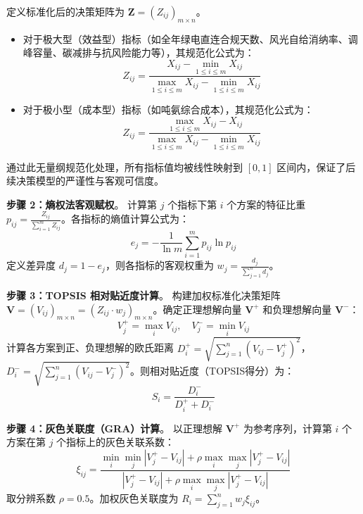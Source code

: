 定义标准化后的决策矩阵为 $\mathbf{Z} = (Z_{ij})_{m \times n}$。
\begin{itemize}
    \item 对于极大型（效益型）指标（如全年绿电直连合规天数、风光自给消纳率、调峰容量、碳减排与抗风险能力等），其规范化公式为：
    \begin{equation}
    Z_{ij} = \frac{X_{ij} - \min_{1 \le i \le m} X_{ij}}{\max_{1 \le i \le m} X_{ij} - \min_{1 \le i \le m} X_{ij}}
    \end{equation}
    \item 对于极小型（成本型）指标（如吨氨综合成本），其规范化公式为：
    \begin{equation}
    Z_{ij} = \frac{\max_{1 \le i \le m} X_{ij} - X_{ij}}{\max_{1 \le i \le m} X_{ij} - \min_{1 \le i \le m} X_{ij}}
    \end{equation}
\end{itemize}
通过此无量纲规范化处理，所有指标值均被线性映射到 $[0, 1]$ 区间内，保证了后续决策模型的严谨性与客观可信度。

\textbf{步骤 2：熵权法客观赋权}。
计算第 $j$ 个指标下第 $i$ 个方案的特征比重 $p_{ij} = \frac{Z_{ij}}{\sum_{i=1}^m Z_{ij}}$。各指标的熵值计算公式为：
\begin{equation}
e_j = -\frac{1}{\ln m} \sum_{i=1}^m p_{ij} \ln p_{ij}
\end{equation}
定义差异度 $d_j = 1 - e_j$，则各指标的客观权重为 $w_j = \frac{d_j}{\sum_{j=1}^n d_j}$。

\textbf{步骤 3：TOPSIS 相对贴近度计算}。
构建加权标准化决策矩阵 $\mathbf{V} = (V_{ij})_{m \times n} = (Z_{ij} \cdot w_j)_{m \times n}$。确定正理想解向量 $\mathbf{V}^+$ 和负理想解向量 $\mathbf{V}^-$：
\begin{equation}
V^+_j = \max_i V_{ij}, \quad V^-_j = \min_i V_{ij}
\end{equation}
计算各方案到正、负理想解的欧氏距离 $D^+_i = \sqrt{\sum_{j=1}^n (V_{ij} - V^+_j)^2}$，$D^-_i = \sqrt{\sum_{j=1}^n (V_{ij} - V^-_j)^2}$。则相对贴近度（TOPSIS得分）为：
\begin{equation}
S_i = \frac{D^-_i}{D^+_i + D^-_i}
\end{equation}

\textbf{步骤 4：灰色关联度（GRA）计算}。
以正理想解 $\mathbf{V}^+$ 为参考序列，计算第 $i$ 个方案在第 $j$ 个指标上的灰色关联系数：
\begin{equation}
\xi_{ij} = \frac{\min_i \min_j |V^+_j - V_{ij}| + \rho \max_i \max_j |V^+_j - V_{ij}|}{|V^+_j - V_{ij}| + \rho \max_i \max_j |V^+_j - V_{ij}|}
\end{equation}
取分辨系数 $\rho = 0.5$。加权灰色关联度为 $R_i = \sum_{j=1}^n w_j \xi_{ij}$。

